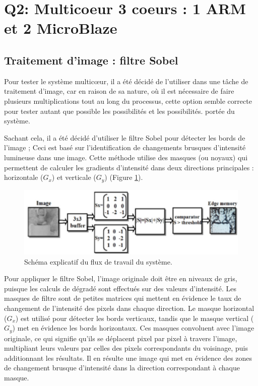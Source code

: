 \documentclass[../CSC_5RO07_TA.tex]{subfiles}
\begin{document}
\section{Q2: Multicoeur 3 coeurs : 1 ARM et 2 MicroBlaze}

\subsection{Traitement d'image : filtre Sobel}

Pour tester le système multicœur, il a été décidé de l'utiliser dans une tâche de traitement d'image, car en raison de sa nature, où il est nécessaire de faire plusieurs multiplications tout au long du processus, cette option semble correcte pour tester autant que possible les possibilités et les possibilités. portée du système. 

\vspace{1em} 

Sachant cela, il a été décidé d'utiliser le filtre Sobel pour détecter les bords de l'image ; Ceci est basé sur l’identification de changements brusques d’intensité lumineuse dans une image. Cette méthode utilise des masques (ou noyaux) qui permettent de calculer les gradients d'intensité dans deux directions principales : horizontale ($G_x$) et verticale ($G_y$) (Figure \ref{fig:1}).

\begin{figure}[H]
    \centering
    \includegraphics[width=0.7\columnwidth]{./images/FiltreSobel.jpg}
    \caption{Schéma explicatif du flux de travail du système.}
    \label{fig:1}
\end{figure}

Pour appliquer le filtre Sobel, l'image originale doit être en niveaux de gris, puisque les calculs de dégradé sont effectués sur des valeurs d'intensité. Les masques de filtre sont de petites matrices qui mettent en évidence le taux de changement de l'intensité des pixels dans chaque direction. Le masque horizontal ($G_x$) est utilisé pour détecter les bords verticaux, tandis que le masque vertical ($G_y$) met en évidence les bords horizontaux. Ces masques convoluent avec l'image originale, ce qui signifie qu'ils se déplacent pixel par pixel à travers l'image, multipliant leurs valeurs par celles des pixels correspondants du voisinage, puis additionnant les résultats. Il en résulte une image qui met en évidence des zones de changement brusque d'intensité dans la direction correspondant à chaque masque. 
\end{document}
